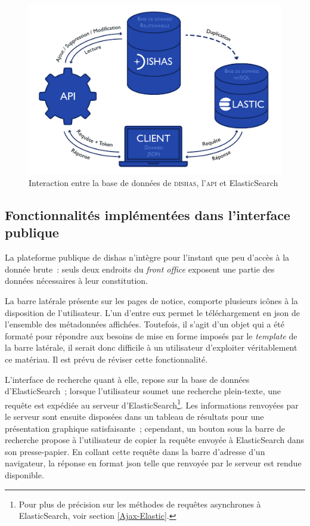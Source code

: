 \documentclass[a4paper,12pt,twoside]{book}
\newcommand{\eng}{\emph}
\newcommand{\bdd}{base de données\xspace}
\newcommand{\fo}{\eng{front office}\xspace}
\newcommand{\dishas}{\gls{dishas}\xspace}
\newcommand{\json}{\gls{json}\xspace}
\begin{document}
\begin{figure}[h!]
	\centering
	\includegraphics[width=14cm]{Images/BDD-ElasticSearch-API.png}
	\caption{Interaction entre la \bdd de \textsc{dishas}, l'\textsc{api} et ElasticSearch}
\end{figure}

		\subsection{Fonctionnalités implémentées dans l'interface publique}
La plateforme publique de \dishas n'intègre pour l'instant que peu d'accès à la donnée brute~: seuls deux endroits du \fo exposent une partie des données nécessaires à leur constitution.

La barre latérale présente sur les pages de notice, comporte plusieurs icônes à la disposition de l'utilisateur. L'un d'entre eux permet le téléchargement en \json de l'ensemble des métadonnées affichées. Toutefois, il s'agit d'un objet qui a été formaté pour répondre aux besoins de mise en forme imposés par le \eng{template} de la barre latérale, il serait donc difficile à un utilisateur d'exploiter véritablement ce matériau. Il est prévu de réviser cette fonctionnalité.

L'interface de recherche quant à elle, repose sur la \bdd d'ElasticSearch~; lorsque l'utilisateur soumet une recherche plein-texte, une requête est expédiée au serveur d'ElasticSearch\footnote{Pour plus de précision sur les méthodes de requêtes asynchrones à ElasticSearch, voir section \ref{Ajax-Elastic}.}. Les informations renvoyées par le serveur sont ensuite disposées dans un tableau de résultats pour une présentation graphique satisfaisante~; cependant, un bouton sous la barre de recherche propose à l'utilisateur de copier la requête envoyée à ElasticSearch dans son presse-papier. En collant cette requête dans la barre d'adresse d'un navigateur, la réponse en format \json telle que renvoyée par le serveur est rendue disponible.
\end{document}
